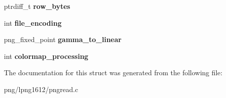 \begin{DoxyCompactItemize}
\item 
\hypertarget{structpng__image__read__control_ac788a77c56f6b93e57041361dbfc2bb9}{ptrdiff\+\_\+t {\bfseries row\+\_\+bytes}}\label{structpng__image__read__control_ac788a77c56f6b93e57041361dbfc2bb9}

\item 
\hypertarget{structpng__image__read__control_a77931c72de5517eccfb756f9e27f3f43}{int {\bfseries file\+\_\+encoding}}\label{structpng__image__read__control_a77931c72de5517eccfb756f9e27f3f43}

\item 
\hypertarget{structpng__image__read__control_aad78903e3776439e708c68a94233a5f6}{png\+\_\+fixed\+\_\+point {\bfseries gamma\+\_\+to\+\_\+linear}}\label{structpng__image__read__control_aad78903e3776439e708c68a94233a5f6}

\item 
\hypertarget{structpng__image__read__control_a76295e2526582e612e8cd898cbb7f840}{int {\bfseries colormap\+\_\+processing}}\label{structpng__image__read__control_a76295e2526582e612e8cd898cbb7f840}

\end{DoxyCompactItemize}


The documentation for this struct was generated from the following file\+:\begin{DoxyCompactItemize}
\item 
png/lpng1612/pngread.\+c\end{DoxyCompactItemize}
